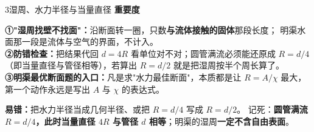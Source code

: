 \begin{kaodian}{3}{湿周、水力半径与当量直径}
\textbf{重要度 }\quad{}\quad{}

\begin{banfa}
\textbf{①"湿周找壁不找面"：}沿断面转一圈，只数\textbf{与流体接触的固体}那段长度；
明渠水面那一段是流体与空气的界面，不计入。\\
\textbf{②防错检查：}把结果代回 $d=4R$ 看单位对不对；圆管满流必须能还原成 $R=d/4$
（即当量直径与管径相等），若算出 $R=d/2$ 就是把湿周按半个周长算了。\\
\textbf{③明渠最优断面题的入口：}凡是求"水力最佳断面"，本质都是让 $R=A/\chi$ 最大，
第一个动作永远是写出 $A$ 与 $\chi$ 的表达式。
\end{banfa}

\begin{yicuo}
\textbf{易错：}把水力半径当成几何半径、或把 $R=d/4$ 写成 $R=d/2$。
记死：\textbf{圆管满流 $R=d/4$，此时当量直径 $4R$ 与管径 $d$ 相等}；明渠的湿周\textbf{一定不含自由表面}。
\end{yicuo}
\end{kaodian}

